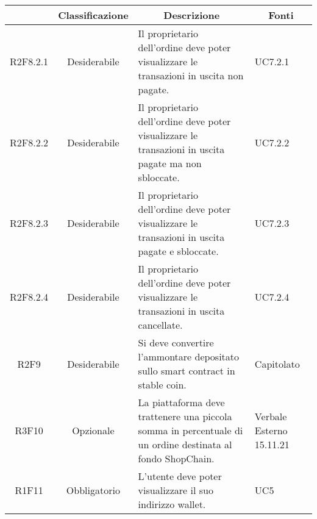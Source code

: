 \begin{table}[H]
    \centering
    \renewcommand{\arraystretch}{1.8}
    \begin{tabular}{c | c | p{6cm} | p{4.1cm}}
        \rowcolor[HTML]{125E28}
        \multicolumn{1}{c}{\color[HTML]{FFFFFF} \textbf{Codice}}          &
        \multicolumn{1}{c}{\color[HTML]{FFFFFF} \textbf{Classificazione}} &
        \multicolumn{1}{c}{\color[HTML]{FFFFFF} \textbf{Descrizione}}     &
        \multicolumn{1}{c}{\color[HTML]{FFFFFF} \textbf{Fonti}}                                                                                                                                                                  \\
        \hline
        R2F8.2.1                                                          & Desiderabile & Il proprietario dell'ordine deve poter visualizzare le transazioni in uscita non pagate.                   & UC7.2.1                  \\
        R2F8.2.2                                                          & Desiderabile & Il proprietario dell'ordine deve poter visualizzare le transazioni in uscita pagate ma non sbloccate.      & UC7.2.2                  \\
        R2F8.2.3                                                          & Desiderabile & Il proprietario dell'ordine deve poter visualizzare le transazioni in uscita pagate e sbloccate.           & UC7.2.3                  \\
        R2F8.2.4                                                          & Desiderabile & Il proprietario dell'ordine deve poter visualizzare le transazioni in uscita cancellate.                   & UC7.2.4                  \\
        R2F9                                                              & Desiderabile & Si deve convertire l'ammontare depositato sullo smart contract\glo{} in stable coin\glo{}.                             & Capitolato               \\
        R3F10                                                             & Opzionale    & La piattaforma deve trattenere una piccola somma in percentuale di un ordine destinata al fondo ShopChain. & Verbale Esterno 15.11.21 \\
        R1F11                                                             & Obbligatorio & L'utente deve poter visualizzare il suo indirizzo wallet.                                                  & UC5                      \\

\end{tabular}
\end{table}
